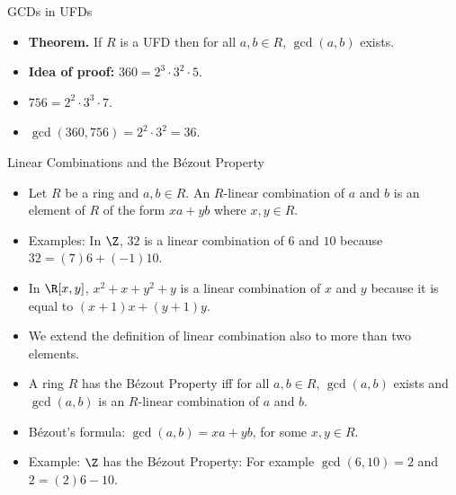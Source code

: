 \documentclass{beamer}
\begin{document}

\begin{frame}{GCDs in UFDs}

\begin{itemize}
  \item \textbf{Theorem.} If $R$ is a UFD then for all $a,b\in R$, $\gcd(a,b)$ exists.
  \item \textbf{Idea of proof:} $360 = 2^3  \cdot 3^2  \cdot 5$.
  \item $756 = 2^2 \cdot 3^3 \cdot 7$.
  \item $\gcd(360,756) = 2^2 \cdot 3^2 = 36$.
\end{itemize}

\end{frame}



\begin{frame}{Linear Combinations and the B\'{e}zout Property}

\begin{itemize}
  \item Let $R$ be a ring and $a,b\in R$. An $R$-linear combination of $a$ and $b$ is an element of $R$ of the form
  $xa+yb$ where $x,y\in R$.
  \item Examples: In $\Z$, $32$ is a linear combination of $6$ and $10$ because $32 = (7)6 + (-1)10$.
  \item In $\R[x,y]$, $x^2 + x + y^2 +y$ is a linear combination of $x$ and $y$ because it is equal to $(x+1)x + (y+1)y$.
  \item We extend the definition of linear combination also to more than two elements.
  \item A ring $R$ has the B\'{e}zout Property iff for all $a,b\in R$, $\gcd(a,b)$ exists and $\gcd(a,b)$ is an $R$-linear
  combination of $a$ and $b$.
  \item B\'{e}zout's formula: $\gcd(a,b) = xa + yb$, for some $x,y\in R$.
  \item Example: $\Z$ has the B\'{e}zout Property: For example $\gcd(6,10) = 2$ and $2=(2)6 - 10$.
\end{itemize}

\end{frame}


\end{document}
